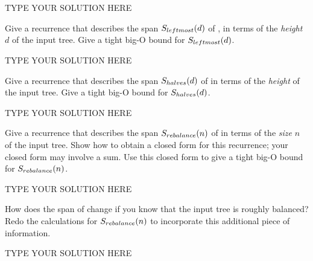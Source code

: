 \documentclass[11pt]{article}
\newcommand{\declarecommand}[1]{\providecommand{#1}{}\renewcommand{#1}}
\begin{document}
\begin{solution}
TYPE YOUR SOLUTION HERE
\end{solution}


\declarecommand{\Sa}{S_{\smle!splitN!}}
\declarecommand{\Sb}{S_{\smle!leftmost!}}
\declarecommand{\Sc}{S_{\smle!halves!}}
\declarecommand{\Sd}{S_{\smle!rebalance!}}
\begin{task}{2} %
  Give a recurrence that describes the span $S_{\smle{leftmost}}(d)$ of
  , in terms of the \emph{height} $d$ of the input tree.  Give a
  tight big-O bound for $S_{\smle{leftmost}}(d)$.
\end{task}

\begin{solution}
TYPE YOUR SOLUTION HERE
\end{solution}


\declarecommand{\Sa}{S_{\smle!splitN!}}
\declarecommand{\Sb}{S_{\smle!leftmost!}}
\declarecommand{\Sc}{S_{\smle!halves!}}
\declarecommand{\Sd}{S_{\smle!rebalance!}}
\begin{task}{2} %
  Give a recurrence that describes the span $S_{\smle{halves}}(d)$ of
   in terms of the \emph{height} of the input tree.  Give a tight
  big-O bound for $S_{\smle{halves}}(d)$.
\end{task}

\begin{solution}
TYPE YOUR SOLUTION HERE
\end{solution}


\declarecommand{\Sa}{S_{\smle!splitN!}}
\declarecommand{\Sb}{S_{\smle!leftmost!}}
\declarecommand{\Sc}{S_{\smle!halves!}}
\declarecommand{\Sd}{S_{\smle!rebalance!}}
\begin{task}{2}
  Give a recurrence that describes the span $S_{\smle{rebalance}}(n)$ of
   in terms of the \emph{size} $n$ of the input tree.
  Show how to obtain a closed form for this recurrence; your closed form may
  involve a sum.  Use this closed form to give a tight big-O bound for
  $S_{\smle{rebalance}}(n)$.
\end{task}

\begin{solution}
TYPE YOUR SOLUTION HERE
\end{solution}


\declarecommand{\Sa}{S_{\smle!splitN!}}
\declarecommand{\Sb}{S_{\smle!leftmost!}}
\declarecommand{\Sc}{S_{\smle!halves!}}
\declarecommand{\Sd}{S_{\smle!rebalance!}}
\declarecommand{\Ka}{k_1+k_2n}
\declarecommand{\K}[1]{k_1+k_2\frac{n}{#1}}
\begin{task}{2}
  How does the span of  change if you know that the input tree
  is roughly balanced?  Redo the calculations for $S_{\smle{rebalance}}(n)$ to
  incorporate this additional piece of information.
\end{task}

\begin{solution}
TYPE YOUR SOLUTION HERE
\end{solution}


\declarecommand{\Sa}{S_{\smle!splitN!}}
\declarecommand{\Sb}{S_{\smle!leftmost!}}
\declarecommand{\Sc}{S_{\smle!halves!}}
\declarecommand{\Sd}{S_{\smle!rebalance!}}
\declarecommand{\Ka}{k_1+k_2\log\,n}
\declarecommand{\K}[1]{k_1+k_2\log\frac{n}{#1}}
\end{document}
